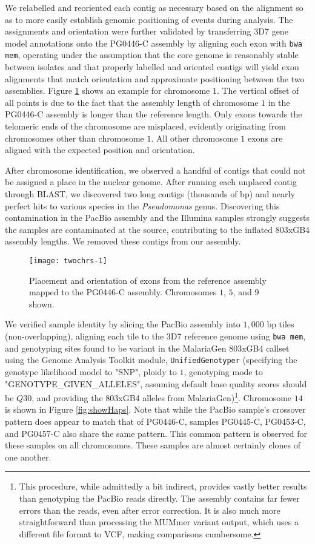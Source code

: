 We relabelled and reoriented each contig as necessary based on the alignment so as to more easily establish genomic positioning of events during analysis.  The assignments and orientation were further validated by transferring 3D7 gene model annotations onto the PG0446-C assembly by aligning each exon with \texttt{bwa mem}, operating under the assumption that the core genome is reasonably stable between isolates and that properly labelled and oriented contigs will yield exon alignments that match orientation and approximate positioning between the two assemblies.  Figure \ref{fig:loadGff} shows an example for chromosome $1$.  The vertical offset of all points is due to the fact that the assembly length of chromosome $1$ in the PG0446-C assembly is longer than the reference length.  Only exons towards the telomeric ends of the chromosome are misplaced, evidently originating from chromosomes other than chromosome $1$.  All other chromosome $1$ exons are aligned with the expected position and orientation.

After chromosome identification, we observed a handful of contigs that could not be assigned a place in the nuclear genome.  After running each unplaced contig through BLAST, we discovered two long contigs (thousands of bp) and nearly perfect hits to various species in the \textit{Pseudomonas} genus.  Discovering this contamination in the PacBio assembly and the Illumina samples strongly suggests the samples are contaminated at the source, contributing to the inflated 803xGB4 assembly lengths.  We removed these contigs from our assembly.

\begin{figure}[h!]
  \centering
    \texttt{[image: twochrs-1]}
  \caption{Placement and orientation of exons from the reference assembly mapped to the PG0446-C assembly.  Chromosomes $1$, $5$, and $9$ shown.}
  \label{fig:loadGff}
\end{figure}

We verified sample identity by slicing the PacBio assembly into $1,000$ bp tiles (non-overlapping), aligning each tile to the 3D7 reference genome using \texttt{bwa mem}, and genotyping sites found to be variant in the MalariaGen 803xGB4 callset using the Genome Analysis Toolkit module, \texttt{UnifiedGenotyper} (specifying the genotype likelihood model to "SNP", ploidy to $1$, genotyping mode to "GENOTYPE\_GIVEN\_ALLELES", assuming default base quality scores should be $Q30$, and providing the 803xGB4 alleles from MalariaGen)\footnote{This procedure, while admittedly a bit indirect, provides vastly better results than genotyping the PacBio reads directly.  The assembly contains far fewer errors than the reads, even after error correction.  It is also much more straightforward than processing the MUMmer variant output, which uses a different file format to VCF, making comparisons cumbersome.}.  Chromosome $14$ is shown in Figure \ref{fig:showHaps}.  Note that while the PacBio sample's crossover pattern does appear to match that of PG0446-C, samples PG0445-C, PG0453-C, and PG0457-C also share the same pattern.  This common pattern is observed for these samples on all chromosomes.  These samples are almost certainly clones of one another.


